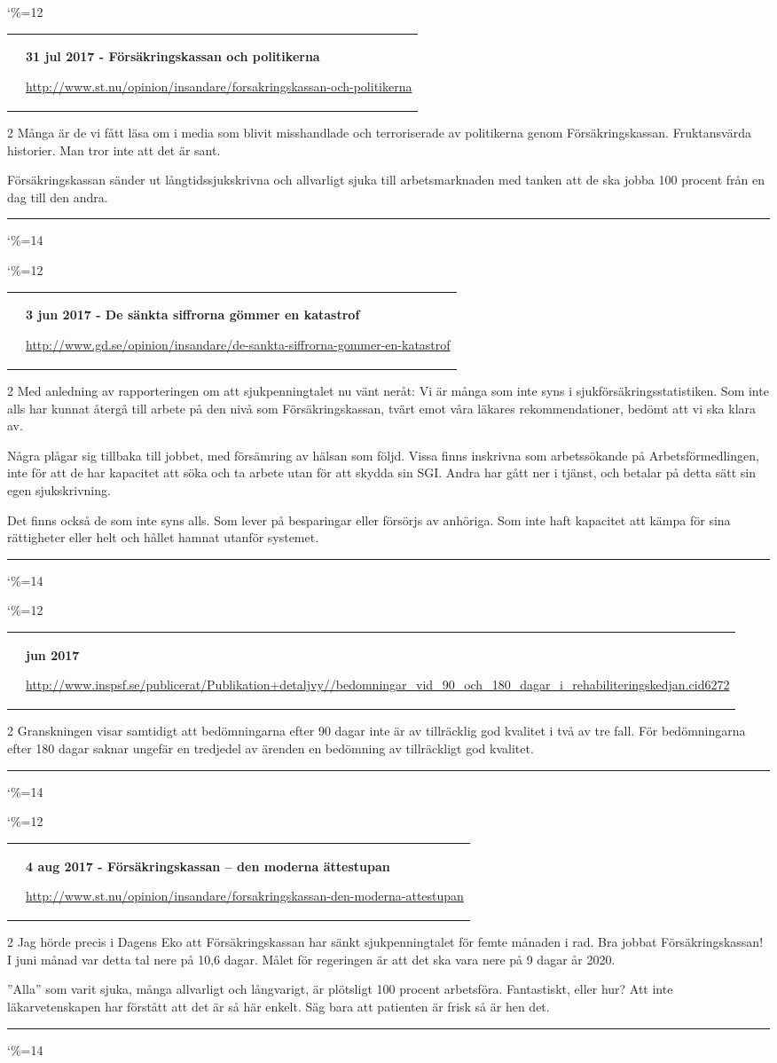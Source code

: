 \documentclass[a4paper]{article}
\makeatletter
\newcommand{\entry}{
\catcode`\%=12
\@entry}
\newcommand{\@entry}[3]{
\bigskip
\begin{tabular*}{\textwidth}{l m{\textwidth-4cm}}
\qrcode{#3} & \textbf{#1}

\medskip

\url{#3}

\end{tabular*}

\medskip


\begin{multicols}{2}
#2
\end{multicols}

\medskip
\hrule

\catcode`\%=14
}
\makeatother
\begin{document}
\entry{31 jul 2017 - Försäkringskassan och politikerna}{Många är de vi fått läsa om i media som blivit misshandlade och terroriserade av politikerna genom Försäkringskassan. Fruktansvärda historier. Man tror inte att det är sant.

Försäkringskassan sänder ut långtidssjukskrivna och allvarligt sjuka till arbetsmarknaden med tanken att de ska jobba 100 procent från en dag till den andra.}{http://www.st.nu/opinion/insandare/forsakringskassan-och-politikerna}


\entry{3 jun 2017 - De sänkta siffrorna gömmer en katastrof}{Med anledning av rapporteringen om att sjukpenningtalet nu vänt neråt: Vi är många som inte syns i sjukförsäkringsstatistiken. Som inte alls har kunnat återgå till arbete på den nivå som Försäkringskassan, tvärt emot våra läkares rekommendationer, bedömt att vi ska klara av.

Några plågar sig tillbaka till jobbet, med försämring av hälsan som följd. Vissa finns inskrivna som arbetssökande på Arbetsförmedlingen, inte för att de har kapacitet att söka och ta arbete utan för att skydda sin SGI. Andra har gått ner i tjänst, och betalar på detta sätt sin egen sjukskrivning.

Det finns också de som inte syns alls. Som lever på besparingar eller försörjs av anhöriga. Som inte haft kapacitet att kämpa för sina rättigheter eller helt och hållet hamnat utanför systemet.}{http://www.gd.se/opinion/insandare/de-sankta-siffrorna-gommer-en-katastrof}

\entry{jun 2017}{Granskningen visar samtidigt att bedömningarna efter 90 dagar inte är av tillräcklig god kvalitet i två av tre fall. För bedömningarna efter 180 dagar saknar ungefär en tredjedel av ärenden en bedömning av tillräckligt god kvalitet.}{http://www.inspsf.se/publicerat/Publikation+detaljvy//bedomningar_vid_90_och_180_dagar_i_rehabiliteringskedjan.cid6272}


\entry{4 aug 2017 - Försäkringskassan – den moderna ättestupan}{Jag hörde precis i Dagens Eko att Försäkringskassan har sänkt sjukpenningtalet för femte månaden i rad. Bra jobbat Försäkringskassan! I juni månad var detta tal nere på 10,6 dagar. Målet för regeringen är att det ska vara nere på 9 dagar år 2020.

”Alla” som varit sjuka, många allvarligt och långvarigt, är plötsligt 100 procent arbetsföra. Fantastiskt, eller hur? Att inte läkarvetenskapen har förstått att det är så här enkelt. Säg bara att patienten är frisk så är hen det.}{http://www.st.nu/opinion/insandare/forsakringskassan-den-moderna-attestupan}
\end{document}
